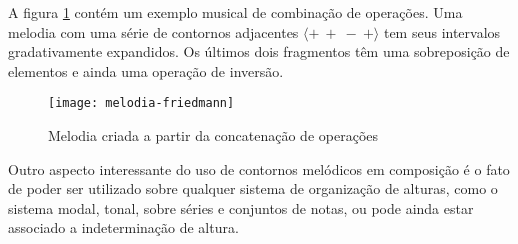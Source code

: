 A figura \ref{fig:melodia-concatenacao-operacoes} contém um exemplo
musical de combinação de operações. Uma melodia com uma série de
contornos adjacentes  $\langle+\:+\:-\:+\rangle$ tem seus
intervalos gradativamente expandidos. Os últimos dois fragmentos têm
uma sobreposição de elementos e ainda uma operação de inversão.

\begin{figure}
  \centering
  \texttt{[image: melodia-friedmann]}
  \caption{Melodia criada a partir da concatenação de operações}
  \label{fig:melodia-concatenacao-operacoes}
\end{figure}

Outro aspecto interessante do uso de contornos melódicos em composição
é o fato de poder ser utilizado sobre qualquer sistema de organização
de alturas, como o sistema modal, tonal, sobre séries e conjuntos de
notas, ou pode ainda estar associado a indeterminação de altura.
